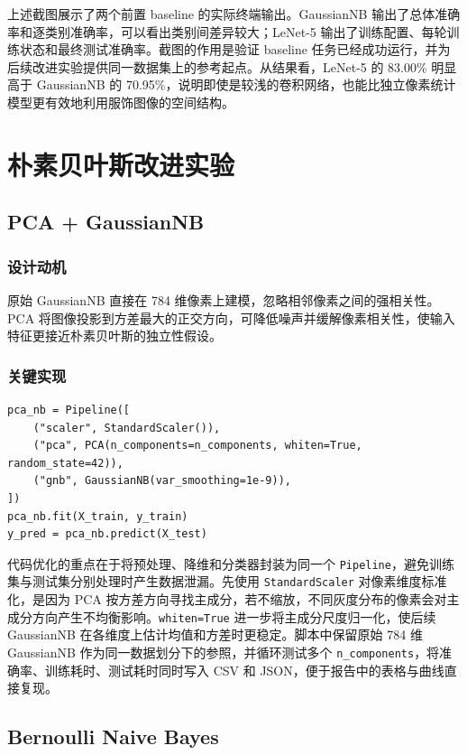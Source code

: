 \documentclass[UTF8]{ctexart}
\begin{document}
上述截图展示了两个前置 baseline 的实际终端输出。GaussianNB 输出了总体准确率和逐类别准确率，可以看出类别间差异较大；LeNet-5 输出了训练配置、每轮训练状态和最终测试准确率。截图的作用是验证 baseline 任务已经成功运行，并为后续改进实验提供同一数据集上的参考起点。从结果看，LeNet-5 的 83.00\% 明显高于 GaussianNB 的 70.95\%，说明即使是较浅的卷积网络，也能比独立像素统计模型更有效地利用服饰图像的空间结构。

\section{朴素贝叶斯改进实验}

\subsection{PCA + GaussianNB}

\subsubsection{设计动机}

原始 GaussianNB 直接在 784 维像素上建模，忽略相邻像素之间的强相关性。PCA 将图像投影到方差最大的正交方向，可降低噪声并缓解像素相关性，使输入特征更接近朴素贝叶斯的独立性假设。

\subsubsection{关键实现}

\begin{lstlisting}[caption={PCA + GaussianNB 的关键实现}]
pca_nb = Pipeline([
    ("scaler", StandardScaler()),
    ("pca", PCA(n_components=n_components, whiten=True, random_state=42)),
    ("gnb", GaussianNB(var_smoothing=1e-9)),
])
pca_nb.fit(X_train, y_train)
y_pred = pca_nb.predict(X_test)
\end{lstlisting}

代码优化的重点在于将预处理、降维和分类器封装为同一个 \texttt{Pipeline}，避免训练集与测试集分别处理时产生数据泄漏。先使用 \texttt{StandardScaler} 对像素维度标准化，是因为 PCA 按方差方向寻找主成分，若不缩放，不同灰度分布的像素会对主成分方向产生不均衡影响。\texttt{whiten=True} 进一步将主成分尺度归一化，使后续 GaussianNB 在各维度上估计均值和方差时更稳定。脚本中保留原始 784 维 GaussianNB 作为同一数据划分下的参照，并循环测试多个 \texttt{n\_components}，将准确率、训练耗时、测试耗时同时写入 CSV 和 JSON，便于报告中的表格与曲线直接复现。

\subsection{Bernoulli Naive Bayes}
\end{document}
